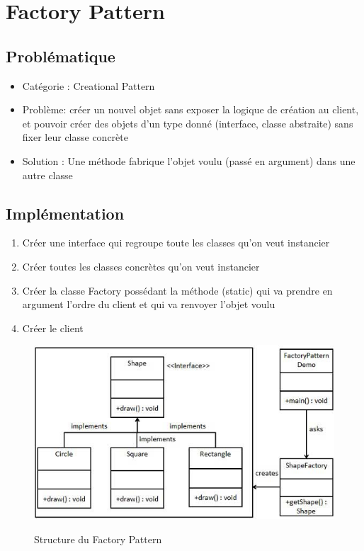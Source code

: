 \section{Factory Pattern}
\subsection{Problématique}
\begin{itemize}
    \item Catégorie : Creational Pattern
    \item Problème: créer un nouvel objet sans exposer la logique de création au client, et pouvoir créer des objets d'un type donné (interface, classe abstraite) sans fixer leur classe concrète
    \item Solution : Une méthode fabrique l’objet voulu (passé en argument) dans une autre classe
\end{itemize}
\subsection{Implémentation}
\begin{enumerate}
    \item Créer une interface qui regroupe toute les classes qu’on veut instancier
    \item Créer toutes les classes concrètes qu’on veut instancier
    \item Créer la classe Factory possédant la méthode (static) qui va prendre en argument l’ordre du client et qui va renvoyer l’objet voulu
    \item Créer le client

\end{enumerate}
\begin{figure}[!ht]
	\centering
	\begin{minipage}[t]{8.0cm}
		\includegraphics[scale=0.5]{Images/fact.jpg}
		\label{s1}
   		\caption{Structure du Factory Pattern}
	\end{minipage}
	
\end{figure}

